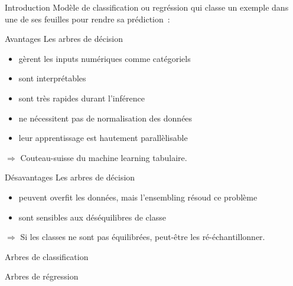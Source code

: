 \begin{frame}{Introduction}
  Modèle de classification ou regréssion qui classe un exemple dans une de ses feuilles pour rendre sa prédiction~:
\end{frame}

\begin{frame}{Avantages}
  Les arbres de décision

  \begin{itemize}
    \item gèrent les inputs numériques comme catégoriels
    \item sont interprétables
    \item sont très rapides durant l'inférence
    \item ne nécessitent pas de normalisation des données
    \item leur apprentissage est hautement parallèlisable
  \end{itemize}

  $\Rightarrow$ Couteau-suisse du machine learning tabulaire.
\end{frame}

\begin{frame}{Désavantages}
  Les arbres de décision

  \begin{itemize}
    \item peuvent overfit les données, mais l'ensembling résoud ce problème
    \item sont sensibles aux déséquilibres de classe
  \end{itemize}
  $\Rightarrow$ Si les classes ne sont pas équilibrées, peut-être les ré-échantillonner.
\end{frame}

\begin{frame}{Arbres de classification}
\end{frame}

\begin{frame}{Arbres de régression}
\end{frame}

